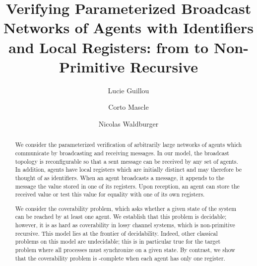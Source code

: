 \documentclass[a4paper,UKenglish,cleveref, autoref, thm-restate]{lipics-v2021}
\title{Verifying Parameterized Broadcast Networks of Agents with Identifiers and Local Registers: from \NP to Non-Primitive Recursive}
\author{Lucie Guillou}{IRIF, Université de Paris}{}{}{}
\author{Corto Mascle}{LaBRI, Université de Bordeaux}{}{}{}
\author{Nicolas Waldburger}{IRISA, Universit\'e de Rennes}{}{}{}
\begin{document}
	
	\maketitle
	
		
	
	\begin{abstract}
	We consider the parameterized verification of arbitrarily large networks of agents which communicate by broadcasting and receiving messages. In our model, the broadcast topology is reconfigurable so that a sent message can be received by any set of agents. In addition, agents have local registers which are initially distinct and may therefore be thought of as identifiers.
	When an agent broadcasts a message, it appends to the message the value stored in one of its registers. Upon reception, an agent can store the received value or test this value for equality with one of its own registers. 

	We consider the coverability problem, which asks whether a given state of the system can be reached by at least one agent. We establish that this problem is decidable; however, it is as hard as coverability in lossy channel systems, which is non-primitive recursive. 
	This model lies at the frontier of decidability. Indeed, other classical problems on this model are undecidable; this is in particular true for the target problem where all processes must synchronize on a given state.  
	By contrast, we show that the coverability problem is \NP-complete when each agent has only one register.
	
	\end{abstract}
\end{document}
